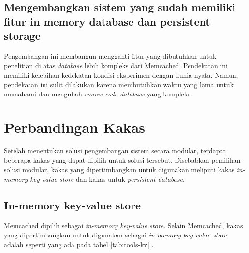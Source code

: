 \subsection{Mengembangkan sistem yang sudah memiliki fitur in memory database dan persistent storage}
Pengembangan ini membangun mengganti fitur yang dibutuhkan untuk penelitian di atas \textit{database} lebih kompleks dari Memcached. Pendekatan ini memiliki kelebihan kedekatan kondisi eksperimen dengan dunia nyata. Namun, pendekatan ini sulit dilakukan karena membutuhkan waktu yang lama untuk memahami dan mengubah \textit{source-code database} yang kompleks.

\section{Perbandingan Kakas}
Setelah menentukan solusi pengembangan sistem secara modular, terdapat beberapa kakas yang dapat dipilih untuk solusi tersebut. Disebabkan pemilihan solusi modular, kakas yang dipertimbangkan untuk digunakan meliputi kakas \textit{in-memory key-value store} dan kakas untuk \textit{persistent database}.

\subsection{In-memory key-value store}
Memcached dipilih sebagai \textit{in-memory key-value store}. Selain Memcached, kakas yang dipertimbangkan untuk digunakan sebagai \textit{in-memory key-value store} adalah seperti yang ada pada tabel \ref{tab:tools-kv} \parencite{redis_docs} \parencite{dragonflydb_docs} \parencite{memcached_documentation}.

\begin{table}[h]
    \centering
    \caption{Perbandingan kakas in-memory key-value store}
    \label{tab:tools-kv}
\end{table}

